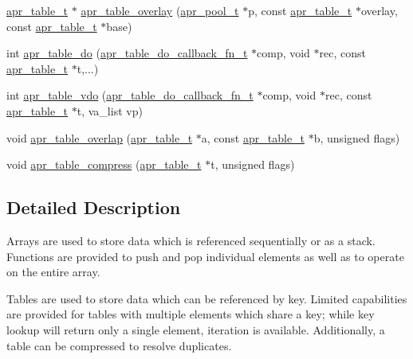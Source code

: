 \begin{DoxyCompactItemize}
\item 
\hyperlink{group__apr__tables_gad7ea82d6608a4a633fc3775694ab71e4}{apr\+\_\+table\+\_\+t} $\ast$ \hyperlink{group__apr__tables_ga783b5c439d46c109bb45e7bc1a6d7ef2}{apr\+\_\+table\+\_\+overlay} (\hyperlink{group__apr__pools_gaf137f28edcf9a086cd6bc36c20d7cdfb}{apr\+\_\+pool\+\_\+t} $\ast$p, const \hyperlink{group__apr__tables_gad7ea82d6608a4a633fc3775694ab71e4}{apr\+\_\+table\+\_\+t} $\ast$overlay, const \hyperlink{group__apr__tables_gad7ea82d6608a4a633fc3775694ab71e4}{apr\+\_\+table\+\_\+t} $\ast$base)
\item 
int \hyperlink{group__apr__tables_ga5917e542ae910961ee48b0ec2d09a879}{apr\+\_\+table\+\_\+do} (\hyperlink{group__apr__tables_gabac50c7b2bae5f8cef6245d1959f8b06}{apr\+\_\+table\+\_\+do\+\_\+callback\+\_\+fn\+\_\+t} $\ast$comp, void $\ast$rec, const \hyperlink{group__apr__tables_gad7ea82d6608a4a633fc3775694ab71e4}{apr\+\_\+table\+\_\+t} $\ast$t,...)
\item 
int \hyperlink{group__apr__tables_ga753c5247c9cd7f90c8958b64d9b6aeae}{apr\+\_\+table\+\_\+vdo} (\hyperlink{group__apr__tables_gabac50c7b2bae5f8cef6245d1959f8b06}{apr\+\_\+table\+\_\+do\+\_\+callback\+\_\+fn\+\_\+t} $\ast$comp, void $\ast$rec, const \hyperlink{group__apr__tables_gad7ea82d6608a4a633fc3775694ab71e4}{apr\+\_\+table\+\_\+t} $\ast$t, va\+\_\+list vp)
\item 
void \hyperlink{group__apr__tables_ga603ebc9b97703b855f8ad77640165372}{apr\+\_\+table\+\_\+overlap} (\hyperlink{group__apr__tables_gad7ea82d6608a4a633fc3775694ab71e4}{apr\+\_\+table\+\_\+t} $\ast$a, const \hyperlink{group__apr__tables_gad7ea82d6608a4a633fc3775694ab71e4}{apr\+\_\+table\+\_\+t} $\ast$b, unsigned flags)
\item 
void \hyperlink{group__apr__tables_ga7f2a652a0cdaf8c20588823c97a3007f}{apr\+\_\+table\+\_\+compress} (\hyperlink{group__apr__tables_gad7ea82d6608a4a633fc3775694ab71e4}{apr\+\_\+table\+\_\+t} $\ast$t, unsigned flags)
\end{DoxyCompactItemize}


\subsection{Detailed Description}
Arrays are used to store data which is referenced sequentially or as a stack. Functions are provided to push and pop individual elements as well as to operate on the entire array.

Tables are used to store data which can be referenced by key. Limited capabilities are provided for tables with multiple elements which share a key; while key lookup will return only a single element, iteration is available. Additionally, a table can be compressed to resolve duplicates.


